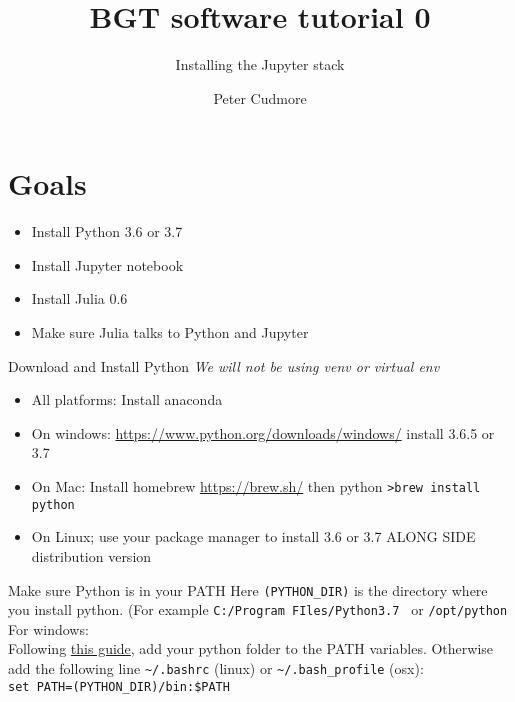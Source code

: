 \documentclass[11pt,reqno]{beamer}
\title{BGT software tutorial 0}
\subtitle{Installing the Jupyter stack}
\author{Peter Cudmore}
\institute{Systems Biology Lab, The University of Melbourne}
\begin{document}
	\hypersetup{urlcolor=blue, linkcolor=blue}
	\begin{frame}
	\titlepage
	\addtocounter{framenumber}{-1} 
\end{frame}
\begin{frame}
\tableofcontents[hideallsubsections]
\end{frame}
\section{Goals}
\begin{frame}
\begin{itemize}
	\item Install Python 3.6 or 3.7
	\item Install Jupyter notebook
	\item Install Julia 0.6
	\item Make sure Julia talks to Python and Jupyter
\end{itemize}
\end{frame}
\begin{frame}{Download and Install Python}
\emph{We will not be using venv or virtual env} 
\begin{itemize}
	\item All platforms: Install anaconda
	\item On windows: \url{https://www.python.org/downloads/windows/} install 3.6.5 or 3.7
	\item On Mac: Install homebrew \url{https://brew.sh/} then python \texttt{>brew install python} 
	\item On Linux; use your package manager to install 3.6 or 3.7 ALONG SIDE distribution version
\end{itemize}
\end{frame}
\begin{frame}{Make sure Python is in your PATH}
Here \texttt{(PYTHON\_DIR)} is the directory where you install python. (For example 
\texttt{C:\slash Program FIles\slash Python3.7 } or \texttt{/opt/python}
\vfill
For windows:\\
Following \href{https://helpdeskgeek.com/windows-10/add-windows-path-environment-variable/}{this guide}, add your python folder to the PATH variables.
\vfill
Otherwise add the following line \texttt{\textasciitilde\slash.bashrc} (linux) or \texttt{\textasciitilde\slash.bash\_profile} (osx):\\
\vspace{10pt}
\texttt{set PATH=(PYTHON\_DIR)\slash bin:\$PATH}\\
\vfill
\end{frame}
\end{document}
